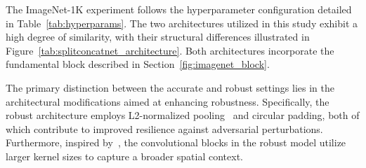      The ImageNet-1K experiment follows the hyperparameter configuration detailed in Table~\ref{tab:hyperparams}. The two architectures utilized in this study exhibit a high degree of similarity, with their structural differences illustrated in Figure~\cref{tab:splitconcatnet_architecture}. Both architectures incorporate the fundamental block described in Section~\cref{fig:imagenet_block}.

    The primary distinction between the accurate and robust settings lies in the architectural modifications aimed at enhancing robustness. Specifically, the robust architecture employs L2-normalized pooling~\cite{boureau2010theoretical} and circular padding, both of which contribute to improved resilience against adversarial perturbations. Furthermore, inspired by~\cite{trockman_patches_2022}, the convolutional blocks in the robust model utilize larger kernel sizes to capture a broader spatial context.




    
